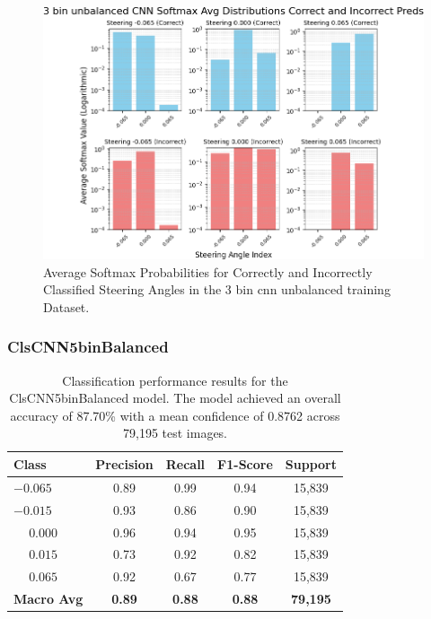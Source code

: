 \begin{figure}[H]
    \centering
    \includegraphics[width=1\linewidth]{Figures/Results/3_bins_cnn_softmax_dist_plot_unbalanced.png}
    \caption{Average Softmax Probabilities for Correctly and Incorrectly Classified Steering Angles in the 3 bin cnn unbalanced training Dataset.}
    \label{fig:3_bins_cnn_softmax_dist_unbalanced}
\end{figure}


\subsubsection{ClsCNN5binBalanced}

\begin{table}[htbp]
\centering
\begin{tabular}{@{}lcccc@{}}
\toprule
\textbf{Class} & \textbf{Precision} & \textbf{Recall} & \textbf{F1-Score} & \textbf{Support} \\
\midrule
$-0.065$ & 0.89 & 0.99 & 0.94 & 15,839 \\
$-0.015$ & 0.93 & 0.86 & 0.90 & 15,839 \\
$\phantom{-}0.000$ & 0.96 & 0.94 & 0.95 & 15,839 \\
$\phantom{-}0.015$ & 0.73 & 0.92 & 0.82 & 15,839 \\
$\phantom{-}0.065$ & 0.92 & 0.67 & 0.77 & 15,839 \\
\midrule
\textbf{Macro Avg} & \textbf{0.89} & \textbf{0.88} & \textbf{0.88} & \textbf{79,195} \\
\bottomrule
\end{tabular}
\caption{Classification performance results for the ClsCNN5binBalanced model. The model achieved an overall accuracy of 87.70\% with a mean confidence of 0.8762 across 79,195 test images.}
\label{tab:clf_report_ClsCNN5binBalanced}
\end{table}

